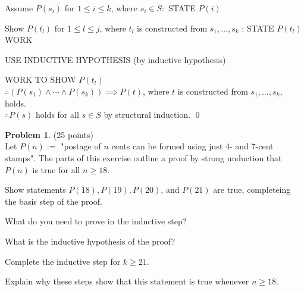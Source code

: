 \documentclass{article}
\theoremstyle{definition}
\newtheorem{problem}{Problem}
\begin{document}
Assume $P(s_i)$ for $1 \leq i \leq k$, where $s_i \in S:$ STATE $P(i)$

Show $P(t_l)$ for $1 \leq l \leq j$, where $t_l$ is constructed from $s_1,\ldots,s_k$ : STATE $P(t_l)$\\

WORK

USE INDUCTIVE HYPOTHESIS \hfill (by inductive hypothesis)

WORK TO SHOW $P(t_l)$\\

$\therefore (P(s_1) \wedge \cdots \wedge P(s_k))\implies P(t)$, where $t$ is constructed from $s_1,\ldots,s_k,$ holds.\\

\noindent
$\therefore P(s)$ holds for all $s \in S$ by structural induction. \qed

\vfill

\newpage

\begin{problem} (25 points)\\
Let $P(n) := $ "postage of $n$ cents can be formed using just 4- and 7-cent stamps".  The parts of this exercise outline a proof by strong unduction that $P(n)$ is true for all $n \geq 18$. 
\begin{compactenum}
\renewcommand{\theenumi}{\alph{enumi}}
\item Show statements $P(18), P(19), P(20)$, and $P(21)$ are true, completeing the basis step of the proof.
\item What do you need to prove in the inductive step?
\item What is the inductive hypothesis of the proof?
\item Complete the inductive step for $k \geq 21$.
\item Explain why these steps show that this statement is true whenever $n\geq18$.
\end{compactenum}
\end{problem}
\end{document}
